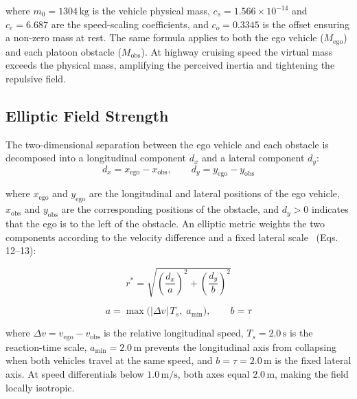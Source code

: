 \documentclass[12pt,a4paper,oneside]{report}
\begin{document}
where $m_0 = 1304\,\mathrm{kg}$ is the vehicle physical mass, $c_s = 1.566 \times 10^{-14}$ and $c_e = 6.687$ are the speed-scaling coefficients, and $c_o = 0.3345$ is the offset ensuring a non-zero mass at rest. The same formula applies to both the ego vehicle ($M_{\mathrm{ego}}$) and each platoon obstacle ($M_{\mathrm{obs}}$). At highway cruising speed the virtual mass exceeds the physical mass, amplifying the perceived inertia and tightening the repulsive field.

\subsection{Elliptic Field Strength}
\label{sec:lat_elliptic}

The two-dimensional separation between the ego vehicle and each obstacle is decomposed into a longitudinal component $d_x$ and a lateral component $d_y$:
\begin{equation}
d_x = x_{\mathrm{ego}} - x_{\mathrm{obs}}, \qquad d_y = y_{\mathrm{ego}} - y_{\mathrm{obs}}
\label{eq:lat_separation}
\end{equation}

where $x_{\mathrm{ego}}$ and $y_{\mathrm{ego}}$ are the longitudinal and lateral positions of the ego vehicle, $x_{\mathrm{obs}}$ and $y_{\mathrm{obs}}$ are the corresponding positions of the obstacle, and $d_y > 0$ indicates that the ego is to the left of the obstacle. An elliptic metric weights the two components according to the velocity difference and a fixed lateral scale~\cite{liSharedControlNovel2019} (Eqs.\,12--13):

\begin{equation}
r^{*} = \sqrt{\left(\frac{d_x}{a}\right)^{\!2} + \left(\frac{d_y}{b}\right)^{\!2}}
\label{eq:lat_elliptic_dist}
\end{equation}

\begin{equation}
a = \max\!\bigl(|\Delta v|\,T_s,\; a_{\min}\bigr), \qquad b = \tau
\label{eq:lat_elliptic_axes}
\end{equation}

where $\Delta v = v_{\mathrm{ego}} - v_{\mathrm{obs}}$ is the relative longitudinal speed, $T_s = 2.0\,\mathrm{s}$ is the reaction-time scale, $a_{\min} = 2.0\,\mathrm{m}$ prevents the longitudinal axis from collapsing when both vehicles travel at the same speed, and $b = \tau = 2.0\,\mathrm{m}$ is the fixed lateral axis. At speed differentials below $1.0\,\mathrm{m/s}$, both axes equal $2.0\,\mathrm{m}$, making the field locally isotropic.
\end{document}
